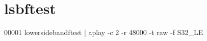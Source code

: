 \hypertarget{lsbftest_source}{\section{lsbftest}
\label{lsbftest_source}
}

\begin{DoxyCode}
00001 lowersidebandftest | aplay -c 2 -r 48000 -t raw -f S32\_LE
\end{DoxyCode}
